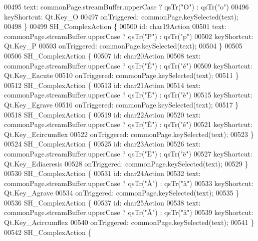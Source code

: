 \begin{DoxyCode}
00495         text: commonPage.streamBuffer.upperCase ? qsTr(\textcolor{stringliteral}{"O"}) : qsTr(\textcolor{stringliteral}{"o"})
00496         keyShortcut: Qt.Key\_O
00497         onTriggered: commonPage.keySelected(text);
00498     \}
00499     SH\_ComplexAction \{
00500         \textcolor{keywordtype}{id}: char19Action
00501         text: commonPage.streamBuffer.upperCase ? qsTr(\textcolor{stringliteral}{"P"}) : qsTr(\textcolor{stringliteral}{"p"})
00502         keyShortcut: Qt.Key\_P
00503         onTriggered: commonPage.keySelected(text);
00504     \}
00505 
00506     SH\_ComplexAction \{
00507         \textcolor{keywordtype}{id}: char20Action
00508         text: commonPage.streamBuffer.upperCase ? qsTr(\textcolor{stringliteral}{"É"}) : qsTr(\textcolor{stringliteral}{"é"})
00509         keyShortcut: Qt.Key\_Eacute
00510         onTriggered: commonPage.keySelected(text);
00511     \}
00512     SH\_ComplexAction \{
00513         \textcolor{keywordtype}{id}: char21Action
00514         text: commonPage.streamBuffer.upperCase ? qsTr(\textcolor{stringliteral}{"Ẽ"}) : qsTr(\textcolor{stringliteral}{"è"})
00515         keyShortcut: Qt.Key\_Egrave
00516         onTriggered: commonPage.keySelected(text);
00517     \}
00518     SH\_ComplexAction \{
00519         \textcolor{keywordtype}{id}: char22Action
00520         text: commonPage.streamBuffer.upperCase ? qsTr(\textcolor{stringliteral}{"Ê"}) : qsTr(\textcolor{stringliteral}{"ê"})
00521         keyShortcut: Qt.Key\_Ecircumflex
00522         onTriggered: commonPage.keySelected(text);
00523     \}
00524     SH\_ComplexAction \{
00525         \textcolor{keywordtype}{id}: char23Action
00526         text: commonPage.streamBuffer.upperCase ? qsTr(\textcolor{stringliteral}{"Ë"}) : qsTr(\textcolor{stringliteral}{"ë"})
00527         keyShortcut: Qt.Key\_Ediaeresis
00528         onTriggered: commonPage.keySelected(text);
00529     \}
00530     SH\_ComplexAction \{
00531         \textcolor{keywordtype}{id}: char24Action
00532         text: commonPage.streamBuffer.upperCase ? qsTr(\textcolor{stringliteral}{"À"}) : qsTr(\textcolor{stringliteral}{"à"})
00533         keyShortcut: Qt.Key\_Agrave
00534         onTriggered: commonPage.keySelected(text);
00535     \}
00536     SH\_ComplexAction \{
00537         \textcolor{keywordtype}{id}: char25Action
00538         text: commonPage.streamBuffer.upperCase ? qsTr(\textcolor{stringliteral}{"Â"}) : qsTr(\textcolor{stringliteral}{"â"})
00539         keyShortcut: Qt.Key\_Acircumflex
00540         onTriggered: commonPage.keySelected(text);
00541     \}
00542     SH\_ComplexAction \{

\end{DoxyCode}
